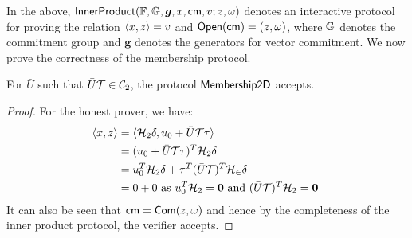 In the above,
$\mathsf{InnerProduct}(\mathbb{F},\mathbb{G},\bm{g},x,\mathsf{cm},v;z,\omega)$ denotes an interactive
protocol for proving the relation $\langle x,z\rangle=v$ and $\mathsf{Open}(\mathsf{cm})=(z,\omega)$,
where $\mathbb{G}$ denotes the commitment group and $\bm{g}$ denotes the generators for
vector commitment. We now prove the correctness of the membership protocol.

\begin{lemma}[Completeness]\label{lem:proximity2d_complete}
For $\bar{U}$ such that $\bar{U}\mathcal{T}\in \mathcal{C}_2$, the protocol $\mathsf{Membership2D}$ accepts.
\end{lemma}
\begin{proof}
For the honest prover, we have:
\begin{align*}
\langle x,z\rangle &= \langle \mathcal{H}_2\delta,u_0+\bar{U}\mathcal{T}\tau\rangle \\
	&= (u_0+\bar{U}\mathcal{T}\tau)^T\mathcal{H}_2\delta \\
	&= u_0^T\mathcal{H}_2\delta + \tau^T(\bar{U}\mathcal{T})^T\mathcal{H_2}\delta \\
	&= 0 + 0 \text{ as $u_0^T\mathcal{H}_2=\bm{0}$ and $(\bar{U}\mathcal{T})^T\mathcal{H}_2=\bm{0}$ }
\end{align*}
It can also be seen that $\mathsf{cm}=\mathsf{Com}(z,\omega)$ and hence by the completeness of the inner product protocol, the verifier accepts.
\end{proof}
 
